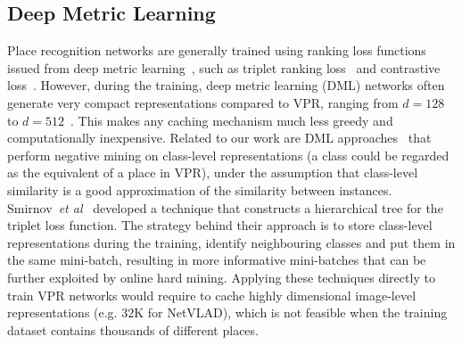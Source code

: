 \documentclass{bmvc2k}
\def\etal{\emph{et al}\bmvaOneDot}
\begin{document}
\subsection{Deep Metric Learning}\label{ssec:dml}
Place recognition networks are generally trained using ranking loss functions issued from deep metric learning~\cite{zhang2021visual}, such as triplet ranking loss~\cite{schroff2015facenet} and contrastive loss~\cite{thoma2020soft}. However, during the training, deep metric learning (DML) networks often generate very compact representations compared to VPR, ranging from $d =128$ to $d=512$~\cite{chen2021deep}. This makes any caching mechanism much less greedy and computationally inexpensive. Related to our work are DML approaches~\cite{ge2018deep, smirnov2018hard} that perform negative mining on class-level representations (a class could be regarded as the equivalent of a place in VPR), under the assumption that class-level similarity is a good approximation of the similarity between instances.  Smirnov~\etal~\cite{ge2018deep} developed a technique that constructs a hierarchical tree for the triplet loss function. The strategy behind their approach is to store class-level representations during the training, identify neighbouring classes and put them in the same mini-batch, resulting in more informative mini-batches that can be further exploited by online hard mining. Applying these techniques directly to train VPR networks would require to cache highly dimensional image-level representations (e.g. $32$K for NetVLAD), which is not feasible when the training dataset contains thousands of different places.
\end{document}
